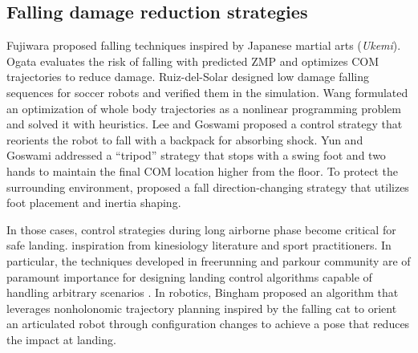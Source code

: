 \subsection{Falling damage reduction strategies}
Fujiwara \etal
\cite{Fujiwara:2002:UFM,Fujiwara:2003:FHH,Fujiwara:2006:TOF,Fujiwara:2007:OPF}
proposed falling techniques inspired by Japanese martial arts (\emph{Ukemi}).
Ogata \etal \cite{Ogata:2007:FMC,Ogata:2008:RSG} evaluates the risk of falling with
predicted ZMP and optimizes COM trajectories to reduce damage. 
Ruiz-del-Solar \etal \cite{Ruiz:2009:LTF,Ruiz:2010:FDM} designed low damage
falling sequences for soccer robots and verified them in the simulation. 
Wang \etal \cite{Wang:2012:WTO} formulated an optimization of whole body
trajectories as a nonlinear programming problem and solved it with heuristics.
Lee and Goswami \cite{Lee:2012:FOB} proposed a control strategy that
reorients the robot to fall with a backpack for absorbing shock. 
Yun and Goswami \cite{Yun:2014:TFC} addressed a ``tripod'' strategy that
stops with a swing foot and two hands to maintain the final COM location
higher from the floor.   
To protect the surrounding environment, \cite{Goswami:2014:DCF} proposed a
fall direction-changing strategy that utilizes foot placement and inertia
shaping.

In those cases, control strategies during long airborne phase
become critical for safe landing.
 inspiration from
kinesiology literature and sport practitioners. In particular, the
techniques developed in freerunning and parkour community are of
paramount importance for designing landing control algorithms capable
of handling arbitrary scenarios
\cite{Edwardes:2009:TPF,HLJ:2011:URL}. 
In robotics, Bingham \etal \cite{Bingham:2014:OMA} proposed an algorithm 
that leverages nonholonomic trajectory planning inspired by the
falling cat to orient an articulated robot through configuration
changes to achieve a pose that reduces the impact at landing.

